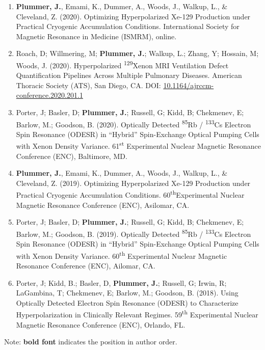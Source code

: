 \documentclass[12pt,]{scrartcl}
\begin{document}
\begin{enumerate}
  \item \textbf{Plummer, J.}, Emami, K., Dummer, A., Woods, J., Walkup, L., \& Cleveland, Z. (2020). Optimizing Hyperpolarized Xe-129 Production under Practical Cryogenic Accumulation Conditions. International Society for Magnetic Resonance in Medicine (ISMRM), online.   
  \item Roach, D; Willmering, M;\textbf{ Plummer, J.}; Walkup, L.; Zhang, Y; Hossain, M; Woods, J. (2020). Hyperpolarized \textsuperscript{129}Xenon MRI Ventilation Defect Quantification Pipelines Across Multiple Pulmonary Diseases. American Thoracic Society (ATS), San Diego, CA. DOI: \href{https://www.atsjournals.org/doi/pdf/10.1164/ajrccm-conference.2020.201.1_MeetingAbstracts.A7893}{10.1164/ajrccm-conference.2020.201.1}
  \item Porter, J; Basler, D; \textbf{Plummer, J.}; Russell, G; Kidd, B; Chekmenev, E; Barlow, M.; Goodson, B. (2020). Optically Detected \textsuperscript{85}Rb / \textsuperscript{133}Cs Electron Spin Resonance (ODESR) in “Hybrid” Spin-Exchange Optical Pumping Cells with Xenon Density Variance. 61\textsuperscript{st} Experimental Nuclear Magnetic Resonance Conference (ENC), Baltimore, MD. 
  \item \textbf{Plummer, J.}, Emami, K., Dummer, A., Woods, J., Walkup, L., \& Cleveland, Z. (2019). Optimizing Hyperpolarized Xe-129 Production under Practical Cryogenic Accumulation Conditions. 60\textsuperscript{th}Experimental Nuclear Magnetic Resonance Conference (ENC), Asilomar, CA. 
  \item Porter, J; Basler, D; \textbf{Plummer, J.}; Russell, G; Kidd, B; Chekmenev, E; Barlow, M.; Goodson, B. (2019). Optically Detected \textsuperscript{85}Rb / \textsuperscript{133}Cs Electron Spin Resonance (ODESR) in “Hybrid” Spin-Exchange Optical Pumping Cells with Xenon Density Variance. 60\textsuperscript{th} Experimental Nuclear Magnetic Resonance Conference (ENC), Ailomar, CA. 
  \item Porter, J; Kidd, B.; Basler, D, \textbf{Plummer, J.}; Russell, G; Irwin, R; LaGambina, T; Chekmenev, E; Barlow, M.; Goodson, B. (2018). Using Optically Detected Electron Spin Resonance (ODESR) to Characterize Hyperpolarization in Clinically Relevant Regimes. 59\textsuperscript{th} Experimental Nuclear Magnetic Resonance Conference (ENC), Orlando, FL. 

  
\end{enumerate}
Note: \textbf{bold font} indicates the position in author order.

\end{document}
